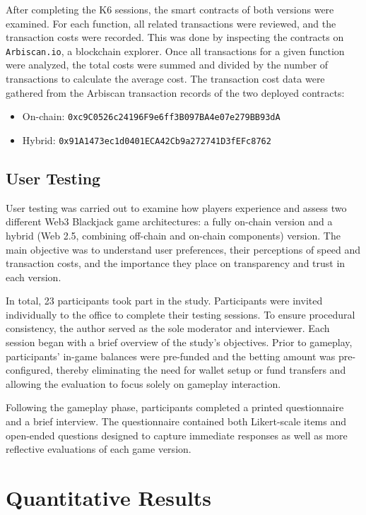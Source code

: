 \documentclass[10pt,conference]{IEEEtran}
\begin{document}
After completing the K6 sessions, the smart contracts of both versions were examined. For each function, all related transactions were reviewed, and the transaction costs were recorded. This was done by inspecting the contracts on \texttt{Arbiscan.io}, a blockchain explorer. Once all transactions for a given function were analyzed, the total costs were summed and divided by the number of transactions to calculate the average cost.
%
The transaction cost data were gathered from the Arbiscan transaction records of the two deployed contracts:

\begin{itemize}
    \item On-chain: \texttt{\scriptsize 0xc9C0526c24196F9e6ff3B097BA4e07e279BB93dA}
    \item Hybrid: \texttt{\scriptsize 0x91A1473ec1d0401ECA42Cb9a272741D3fEFc8762}
\end{itemize}

\subsection{User Testing} \label{sec:usertesting}
User testing was carried out to examine how players experience and assess two different Web3 Blackjack game architectures: a fully on-chain version and a hybrid (Web 2.5, combining off-chain and on-chain components) version. The main objective was to understand user preferences, their perceptions of speed and transaction costs, and the importance they place on transparency and trust in each version.

In total, 23 participants took part in the study. Participants were invited individually to the office to complete their testing sessions. To ensure procedural consistency, the author served as the sole moderator and interviewer. Each session began with a brief overview of the study’s objectives. Prior to gameplay, participants’ in-game balances were pre-funded and the betting amount was pre-configured, thereby eliminating the need for wallet setup or fund transfers and allowing the evaluation to focus solely on gameplay interaction.

Following the gameplay phase, participants completed a printed questionnaire and a brief interview. The questionnaire contained both Likert-scale items and open-ended questions designed to capture immediate responses as well as more reflective evaluations of each game version.



\section{Quantitative Results}\label{sec:quant}
\end{document}
